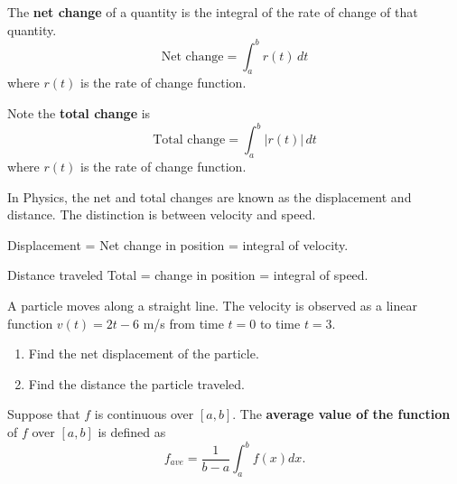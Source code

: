 \begin{definition}

The \textbf{net change} of a quantity is the integral of the rate of
change of that quantity. \[\text{Net change}=\int_a^b r(t)\,dt\] where
\(r(t)\) is the rate of change function.

Note the \textbf{total change} is
\[\text{Total change}=\int_a^b |r(t)|\,dt\] where \(r(t)\) is the rate of
change function.

\end{definition}



In Physics, the net and total changes are known as the displacement and
distance. The distinction is between velocity and speed.

Displacement = Net change in position = integral of velocity.

Distance traveled Total = change in position = integral of speed.


\begin{example}

A particle moves along a straight line. The velocity is observed as a
linear function \(v(t)=2t-6\) m/s from time \(t=0\) to time \(t=3\).

\begin{enumerate}
\item
  Find the net displacement of the particle.
\item
  Find the distance the particle traveled.
\end{enumerate}

\end{example}

\begin{definition}

Suppose that \(f\) is continuous over \([a,b]\). The \textbf{average
value of the function} of \(f\) over \([a, b]\) is defined as
\[f_{ave}=\dfrac{1}{b-a}\int_a^bf(x)dx.\]

\end{definition}


